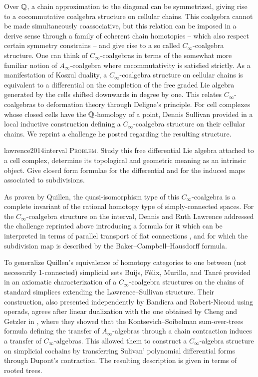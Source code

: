 Over $\mathbb{Q}$, a chain approximation to the diagonal can be symmetrized, giving rise to a cocommutative coalgebra structure on cellular chains.
This coalgebra cannot be made simultaneously coassociative, but this relation can be imposed in a derive sense through a family of coherent chain homotopies -- which also respect certain symmetry constrains -- and give rise to a so called $C_\infty$-coalgebra structure.
One can think of $C_\infty$-coalgebras in terms of the somewhat more familiar notion of $A_\infty$-coalgebra where cocommutativity is satisfied strictly.
As a manifestation of Koszul duality, a $C_\infty$-coalgebra structure on cellular chains is equivalent to a differential on the completion of the free graded Lie algebra generated by the cells shifted downwards in degree by one.
This relates $C_\infty$-coalgebras to deformation theory through Deligne's principle.
For cell complexes whose closed cells have the $\mathbb{Q}$-homology of a point, Dennis Sullivan provided in \cite{sullivan2007appendix} a local inductive construction defining a $C_\infty$-coalgebra structure on their cellular chains.
We reprint a challenge he posted regarding the resulting structure.
\begin{displaycquote}[p.2]{lawrence2014interval}
	\textsc{Problem}. Study this free differential Lie algebra attached to a cell complex, determine its topological and geometric meaning as an intrinsic object.
	Give closed form formulae for the differential and for the induced maps associated to subdivisions.
\end{displaycquote}
As proven by Quillen, the quasi-isomorphism type of this $C_\infty$-coalgebra is a complete invariant of the rational homotopy type of simply-connected spaces.
For the $C_\infty$-coalgebra structure on the interval, Dennis and Ruth Lawrence addressed the challenge reprinted above introducing a formula for it which can be interpreted in terms of parallel transport of flat connections \cite{lawrence2014interval}, and for which the subdivision map is described by the Baker--Campbell--Hausdorff formula.

To generalize Quillen's equivalence of homotopy categories to one between (not necessarily 1-connected) simplicial sets Buijs, F{\'e}lix, Murillo, and Tanr{\'e} provided in \cite{buijs2020liemodels} an axiomatic characterization of a $C_\infty$-coalgebra structures on the chains of standard simplices extending the Lawrence--Sullivan structure.
Their construction, also presented independently by Bandiera and Robert-Nicoud using operads, agrees after linear dualization with the one obtained by Cheng and Getzler in \cite{getzler2008transfering}, where they showed that the Kontsevich--Soibelman sum-over-trees formula defining the transfer of $A_\infty$-algebras through a chain contraction induces a transfer of $C_\infty$-algebras.
This allowed them to construct a $C_\infty$-algebra structure on simplicial cochains by transferring Sulivan' polynomial differential forms \cite{sullivan1977infinitesimal} through Dupont's contraction.
The resulting description is given in terms of rooted trees.

